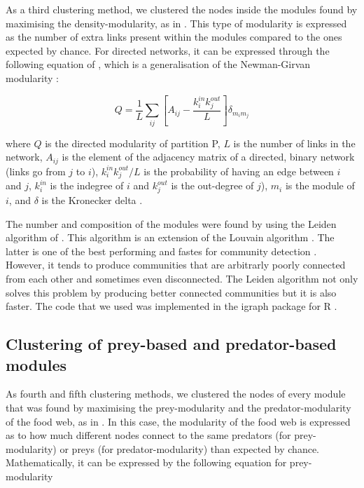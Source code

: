 \documentclass[twocolumn]{article}
\begin{document}
		As a third clustering method, we clustered the nodes inside the modules found by maximising the density-modularity, as in \citet{Guimera2010}. This type of modularity is expressed as the number of extra links present within the modules compared to the ones expected by chance. For directed networks, it can be expressed through the following equation of \citet{Arenas2007}, which is a generalisation of the Newman-Girvan modularity \citep{Newman2004}:

						\begin{equation}
							Q=\frac{1}{L}\sum\limits_{ij}[A_{ij}-\frac{k_i^{in}k_j^{out}}{L}]\delta_{m_im_j} \label{eqn:modularitydensity}
						\end{equation}

		\noindent where $Q$ is the directed modularity of partition P, $L$ is the number of links in the network, $A_{ij}$ is the element of the adjacency matrix of a directed, binary network (links go from $j$ to $i$), $k_i^{in}k_j^{out}/L$ is the probability of having an edge between $i$ and $j$, $k^{in}_i$ is the indegree of $i$ and $k^{out}_j$ is the out-degree of $j$), $ m_i$ is the module of $i$, and $\delta$ is the Kronecker delta \citep{Kozen2007}.

		The number and composition of the modules were found by using the Leiden algorithm of \citet{Traag2019}. This algorithm is an extension of the Louvain algorithm \citep{Blondel2008}. The latter is one of the best performing and fastes for community detection \citep{Traag2019}. However, it tends to produce communities that are arbitrarly poorly connected from each other and sometimes even disconnected. The Leiden algorithm not only solves this problem by producing better connected communities but it is also faster. The code that we used was implemented in the igraph package \citep{Csardi2006} for R \citep{RDevelopmentCoreTeam2011}.

	\subsection*{Clustering of prey-based and predator-based modules}

		As fourth and fifth clustering methods, we clustered the nodes of every module that was found by maximising the prey-modularity and the predator-modularity of the food web, as in \citet{Guimera2010}. In this case, the modularity of the food web is expressed as to how much different nodes connect to the same predators (for prey-modularity) or preys (for predator-modularity) than expected by chance. Mathematically, it can be expressed by the following equation \citep{Guimera2007} for prey-modularity
\end{document}
